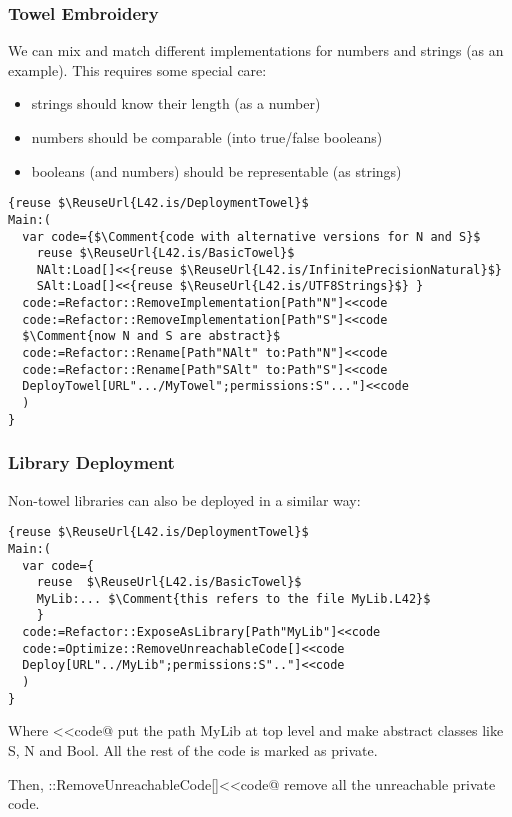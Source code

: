 \begin{frame}[fragile]
\frametitle{Towel Embroidery}
We can mix and match different implementations for numbers and strings (as an example).
This requires some special care:
\begin{itemize}
\item strings should know their length (as a number)
\item numbers should be comparable (into true/false booleans)
\item booleans (and numbers) should be representable (as strings)
\end{itemize}
\begin{NiceCode}{59ex}{0.9}
\begin{lstlisting}
{reuse $\ReuseUrl{L42.is/DeploymentTowel}$
Main:(
  var code={$\Comment{code with alternative versions for N and S}$
    reuse $\ReuseUrl{L42.is/BasicTowel}$
    NAlt:Load[]<<{reuse $\ReuseUrl{L42.is/InfinitePrecisionNatural}$}
    SAlt:Load[]<<{reuse $\ReuseUrl{L42.is/UTF8Strings}$} }
  code:=Refactor::RemoveImplementation[Path"N"]<<code
  code:=Refactor::RemoveImplementation[Path"S"]<<code
  $\Comment{now N and S are abstract}$
  code:=Refactor::Rename[Path"NAlt" to:Path"N"]<<code
  code:=Refactor::Rename[Path"SAlt" to:Path"S"]<<code
  DeployTowel[URL".../MyTowel";permissions:S"..."]<<code
  )
}
\end{lstlisting}
\end{NiceCode}

\end{frame}
\begin{frame}[fragile]
\frametitle{Library Deployment}

Non-towel libraries can also be deployed in a similar way:
\begin{NiceCode}{59ex}{0.9}
\begin{lstlisting}
{reuse $\ReuseUrl{L42.is/DeploymentTowel}$
Main:(
  var code={
    reuse  $\ReuseUrl{L42.is/BasicTowel}$
    MyLib:... $\Comment{this refers to the file MyLib.L42}$
    }
  code:=Refactor::ExposeAsLibrary[Path"MyLib"]<<code
  code:=Optimize::RemoveUnreachableCode[]<<code
  Deploy[URL"../MyLib";permissions:S".."]<<code
  )
}
\end{lstlisting}
\end{NiceCode}
Where <<code@
put the path MyLib at top level and make abstract classes like S, N and Bool.
All the rest of the code is marked as private.

Then, \Q@Optimize::RemoveUnreachableCode[]<<code@ remove all the unreachable private code.

\end{frame}




